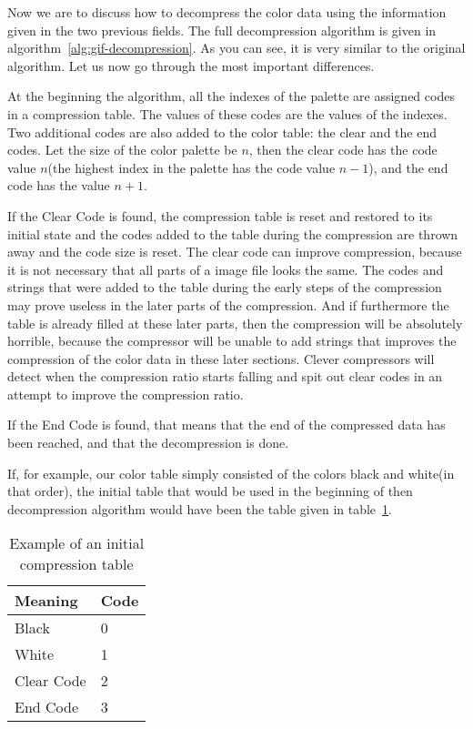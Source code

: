 Now we are to discuss how to decompress the color data using the
information given in the two previous fields. The full decompression
algorithm is given in algorithm~\ref{alg:gif-decompression}. As you
can see, it is very similar to the original \lzw algorithm. Let us
now go through the most important differences.

At the beginning the algorithm, all the indexes of the palette are
assigned codes in a compression table. The values of these codes are
the values of the indexes. Two additional codes are also added to the
color table: the clear and the end codes. Let the size of the color
palette be $n$, then the clear code has the code value $n$(the highest
index in the palette has the code value $n-1$), and the end code has
the value $n+1$.

If the Clear Code is found, the compression table is reset and
restored to its initial state and the codes added to the table during
the compression are thrown away and the code size is reset. The clear
code can improve compression, because it is not necessary that all
parts of a image file looks the same. The codes and strings that were
added to the table during the early steps of the compression may prove
useless in the later parts of the compression. And if furthermore the
table is already filled at these later parts, then the compression
will be absolutely horrible, because the compressor will be unable to
add strings that improves the compression of the color data in these
later sections. Clever \gif compressors will detect when the
compression ratio starts falling and spit out clear codes in an
attempt to improve the compression ratio.

If the End Code is found, that means that the end of the compressed
data has been reached, and that the decompression is done.

If, for example, our color table simply consisted of the colors black
and white(in that order), the initial table that would be used in the
beginning of then decompression algorithm would have been the table
given in table~\ref{tab:example-gif-color-table}.

\begin{table}
  \centering
  \begin{tabular}{ll}
    \toprule
    Meaning & Code \\
    \midrule
    Black & 0 \\
    White & 1 \\
    Clear Code & 2 \\
    End Code & 3 \\
    \bottomrule
  \end{tabular}
  \caption{Example of an initial \gif compression table}
  \label{tab:example-gif-color-table}
\end{table}

